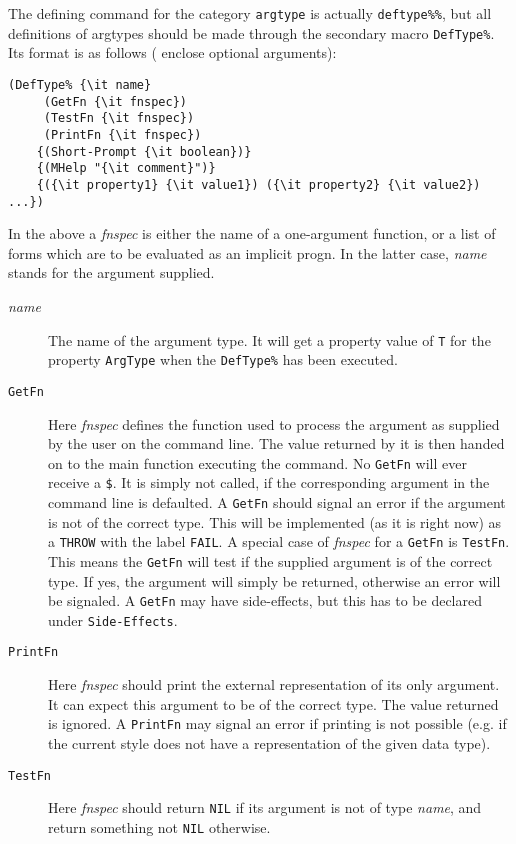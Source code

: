 The defining command for the category {\tt argtype} is actually {\tt deftype\%\%}, but 
all definitions of argtypes should be made through the secondary macro {\tt DefType\%}.
Its format is as follows
({\tt {}} enclose optional arguments):
\begin{verbatim}
(DefType% {\it name}
	 (GetFn {\it fnspec})
	 (TestFn {\it fnspec})
	 (PrintFn {\it fnspec})
	{(Short-Prompt {\it boolean})}
	{(MHelp "{\it comment}")}
	{({\it property1} {\it value1}) ({\it property2} {\it value2}) ...})
\end{verbatim}
In the above a {\it fnspec} is either the name of a one-argument function,
or a list of forms which are to be evaluated as an implicit progn.
In the latter case, {\it name} stands for the argument supplied.
\begin{description}
\item [{\it name}] 
The name of the argument type.  It will get a property value of {\tt T}
for the property {\tt ArgType} when the {\tt DefType\%} has been executed.


\item [{\tt GetFn}] Here {\it fnspec} defines the function used to process the argument
as supplied by the user on the command line.  The value returned by it
is then handed on to the main function executing the command.  No {\tt GetFn}
will ever receive a {\tt \$}.  It is simply not called, if the corresponding
argument in the command line is defaulted.  A {\tt GetFn} should signal an
error if the argument is not
of the correct type.  This will be implemented (as it is right now)
as a {\tt THROW} with the label {\tt FAIL}.  A special case of {\it fnspec}
for a {\tt GetFn} is {\tt TestFn}.  This means the {\tt GetFn} will
test if the supplied argument is of the correct type.  If yes, the argument
will simply be returned, otherwise an error will be signaled.
A {\tt GetFn} may have side-effects, but this has to be declared
under {\tt Side-Effects}.

\item [{\tt PrintFn}] Here {\it fnspec} should print the external representation
of its only argument.  It can expect this argument to be of the correct
type.  The value returned is ignored.  A {\tt PrintFn} may signal an error
if printing is not possible (e.g. if the current style does not
have a representation of the given data type).

\item [{\tt TestFn}] Here {\it fnspec} should return {\tt NIL} if its argument is not of
type {\it name}, and return something not {\tt NIL} otherwise.


\end{description}
